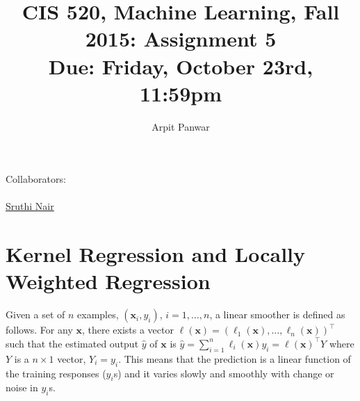 \documentclass[english]{article}
\title{CIS 520, Machine Learning, Fall 2015: Assignment 5 \\
Due: Friday, October 23rd, 11:59pm}
\date{}
\author{Arpit Panwar}
\newcommand{\bx}{\mathbf{x}}
\begin{document}
\maketitle
{\normalsize Collaborators: \\ 
\\ \underline{Sruthi Nair      }} \\

\section{Kernel Regression and Locally Weighted Regression}
\label{sec:regression}

Given a set of $n$ examples, $(\bx_i,y_i)$, $i=1,\ldots,n$, a linear
smoother is defined as follows. For any $\bx$, there exists a vector
$\ell(\bx)=(\ell_1(\bx),\ldots,\ell_n(\bx))^\top$ such that the
estimated output $\hat{y}$ of $\bx$ is
$\hat{y}=\sum_{i=1}^{n}\ell_i(\bx)y_i=\ell(\bx)^\top Y$ where $Y$ is a
$n\times 1$ vector, $Y_i=y_i$.  This means that the prediction is a
linear function of the training responses ($y_i$s) and it varies
slowly and smoothly with change or noise in $y_i$s.

\bigskip
\end{document}
